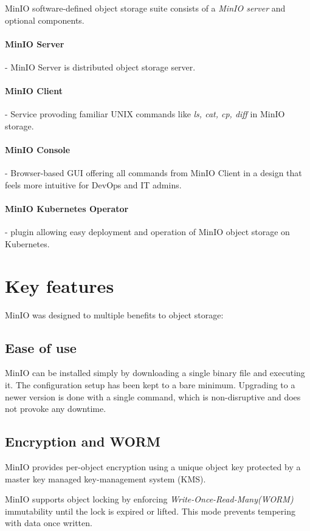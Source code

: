     MinIO software-defined object storage suite consists of a \textit{MinIO server} and optional components.

    \paragraph{MinIO Server} - MinIO Server is distributed object storage server.
    \paragraph{MinIO Client} - Service provoding familiar UNIX commands like \textit{ls, cat, cp, diff} in MinIO storage.
    \paragraph{MinIO Console} - Browser-based GUI offering all commands from MinIO Client in a design that feels more intuitive for DevOps and IT admins.
    \paragraph{MinIO Kubernetes Operator} - plugin allowing easy deployment and operation of MinIO object storage on Kubernetes.

\section{Key features}
    MinIO was designed to multiple benefits to object storage:

    \subsection*{Ease of use}
    MinIO can be installed simply by downloading a single binary file and executing it. The configuration setup has been kept to a bare minimum. Upgrading to a newer version is done with a single command, which is non-disruptive and does not provoke any downtime\cite{minioIntel}.

    \subsection*{Encryption and WORM}
    MinIO provides per-object encryption using a unique object key protected by a master key managed key-management system (KMS).

    MinIO supports object locking by enforcing \textit{Write-Once-Read-Many(WORM)} immutability until the lock is expired or lifted. This mode prevents tempering with data once written\cite{minioHighPerformance}.

